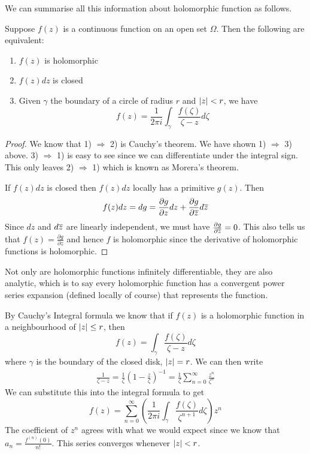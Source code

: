 We can summarise all this information about holomorphic function as follows.
\begin{theorem} \label{thm:holom-tfae}
    Suppose $f(z)$ is a continuous function on an open set $\Omega$. Then the following are equivalent:
    \begin{enumerate}[label=\arabic*)]
        \item $f(z)$ is holomorphic
        \item $f(z) dz$ is closed
        \item Given $\gamma$ the boundary of a circle of radius $r$ and $\left|z\right| < r$, we have $$f(z) = \frac{1}{2\pi i}\int_\gamma \frac{f(\zeta)}{\zeta - z} d\zeta$$ 
    \end{enumerate}
\end{theorem}
\begin{proof}
    We know that 1) $\Rightarrow$ 2) is Cauchy's theorem. We have shown 1) $\Rightarrow$ 3) above. 3) $\Rightarrow$ 1) is easy to see since we can differentiate under the integral sign. This only leaves 2) $\Rightarrow$ 1) which is known as Morera's theorem.

    If $f(z) dz$ is closed then $f(z) dz$ locally has a primitive $g(z)$. Then
    $$f(z)dz = dg = \frac{\partial g}{\partial z}dz + \frac{\partial g}{\partial \overline{z}} d\overline{z}$$
    Since $dz$ and $d\overline{z}$ are linearly independent, we must have $\frac{\partial g}{\partial \overline{z}} = 0$. This also tells us that $f(z) = \frac{\partial g}{\partial z}$ and hence $f$ is holomorphic since the derivative of holomorphic functions is holomorphic.
\end{proof}

Not only are holomorphic functions infinitely differentiable, they are also analytic, which is to say every holomorphic function has a convergent power series expansion (defined locally of course) that represents the function.

By Cauchy's Integral formula we know that if $f(z)$ is a holomorphic function in a neighbourhood of $\left|z\right| \leq r$, then
$$f(z) = \int_\gamma \frac{f(\zeta)}{\zeta - z} d\zeta$$
where $\gamma$ is the boundary of the closed disk, $\left|z\right| = r$.
We can then write
\begin{align*}
    \frac{1}{\zeta - z} = \frac{1}{\zeta} \left( 1 - \frac{z}{\zeta} \right)^{-1} = \frac{1}{\zeta} \sum_{n = 0}^\infty \frac{z^n}{\zeta^n}
\end{align*}
We can substitute this into the integral formula to get
$$ f(z) = \sum_{n = 0}^\infty \left( \frac{1}{2\pi i} \int_\gamma \frac{f(\zeta)}{\zeta^{n + 1}} d\zeta \right) z^n $$
The coefficient of $z^n$ agrees with what we would expect since we know that $a_n = \frac{f^{(n)}(0)}{n!}$. This series converges whenever $\left|z\right| < r$.

